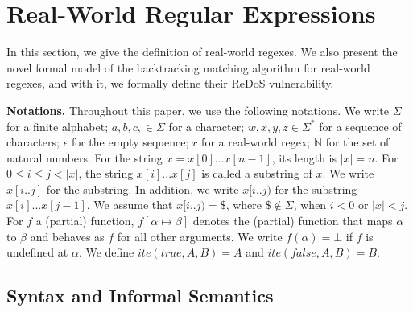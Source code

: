 \documentclass[conference]{IEEEtran}
\newcommand{\texcomment}[1]{}
\begin{document}
 
\section{Real-World Regular Expressions}
\label{sec:regex}
In this section, we give the definition of real-world regexes.  We also present the novel formal model of the backtracking matching algorithm for real-world regexes, and with it, we formally define their ReDoS vulnerability.





{\flushleft\bf Notations.}
Throughout this paper, we use the following notations.
We write $\Sigma$ for a finite alphabet; $a, b, c, \in \Sigma$ for a character; $w, x, y, z \in \Sigma^*$ for a sequence of characters; $\epsilon$ for the empty sequence; $r$ for a real-world regex; $\mathbb{N}$ for the set of natural numbers.
For the string $x = x[0]...x[n-1]$, its length is $|x| = n$.
For $0 \leq i \leq j < |x|$, the string $x[i]...x[j]$ is called a substring of $x$.
We write $x[i..j]$ for the substring.
In addition, we write $x[i..j)$ for the substring $x[i]...x[j-1]$.
We assume that $x[i..j) = \$$, where $\$ \notin \Sigma$, when $i < 0$ or $|x| < j$.
For $f$ a (partial) function,  $f[\alpha\mapsto\beta]$ denotes the (partial) function that maps $\alpha$ to $\beta$ and behaves as $f$ for all other arguments.  We write $f(\alpha) = \bot$ if $f$ is undefined at $\alpha$.
We define $\mathit{ite}(\mathit{true},A,B) = A$ and $\mathit{ite}(\mathit{false},A,B) = B$.



\subsection{Syntax and Informal Semantics}
\texcomment{
\begin{figure}[h]
\setlength\arraycolsep{2pt}
\[
\begin{array}{rcl}
r & ::= & [C] \mid \epsilon \mid rr \mid r|r \mid r^* \\
& \mid & (r)_i \mid \backslash i \mid \mbox{(?=$r$)} \mid \mbox{(?!$r$)} \mid \mbox{(?\textless=$x$)} \mid \mbox{(?\textless!$x$)} \\
\end{array}
\]
\caption{The syntax of real-world regular expressions}
\label{fig:syntax_of_regex}
\end{figure}
The syntax of {\em real-world regexes} (simply {\em regexes} or {\em expressions} henceforth) is given in Figure \ref{fig:syntax_of_regex}.
}
\end{document}
